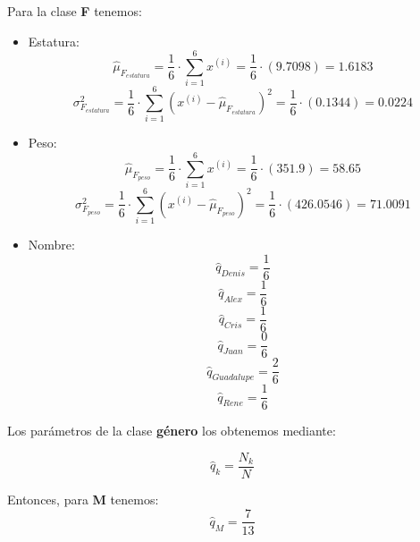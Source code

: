 \documentclass[letterpaper,12pt]{article}
\theoremstyle{definition}
\begin{document}
Para la clase \textbf{F} tenemos:\\
\begin{itemize}
  \item Estatura:
  \begin{equation}
    \hat{\mu}_{F_{estatura}} = \frac{1}{6} \cdot \sum_{i=1}^6 x^{(i)} = \frac{1}{6} \cdot (9.7098) = 1.6183
  \end{equation}
  \begin{equation}
    \sigma^2_{F_{estatura}} = \frac{1}{6} \cdot \sum_{i=1}^6 (x^{(i)} - \hat{\mu}_{F_{estatura}})^2 = \frac{1}{6} \cdot (0.1344) = 0.0224
  \end{equation}
  \item Peso:
  \begin{equation}
    \hat{\mu}_{F_{peso}} = \frac{1}{6} \cdot \sum_{i=1}^6 x^{(i)} = \frac{1}{6} \cdot (351.9) = 58.65
  \end{equation}
  \begin{equation}
    \sigma^2_{F_{peso}} = \frac{1}{6} \cdot \sum_{i=1}^6 (x^{(i)} - \hat{\mu}_{F_{peso}})^2 = \frac{1}{6} \cdot (426.0546) = 71.0091
  \end{equation}
  \item Nombre:
  \begin{equation}
    \hat{q}_{Denis} = \frac{1}{6}
  \end{equation}
  \begin{equation}
    \hat{q}_{Alex} = \frac{1}{6}
  \end{equation}
  \begin{equation}
    \hat{q}_{Cris} = \frac{1}{6}
  \end{equation}
  \begin{equation}
    \hat{q}_{Juan} = \frac{0}{6}
  \end{equation}
  \begin{equation}
    \hat{q}_{Guadalupe} = \frac{2}{6}
  \end{equation}
  \begin{equation}
    \hat{q}_{Rene} = \frac{1}{6}
  \end{equation}
\end{itemize}

Los parámetros de la clase \textbf{género} los obtenemos mediante:

\begin{equation}
  \hat{q}_{k} = \frac{N_k}{N}
\end{equation}

Entonces, para \textbf{M} tenemos:\\
\begin{equation}
  \hat{q}_{M} = \frac{7}{13}
\end{equation}
\end{document}
